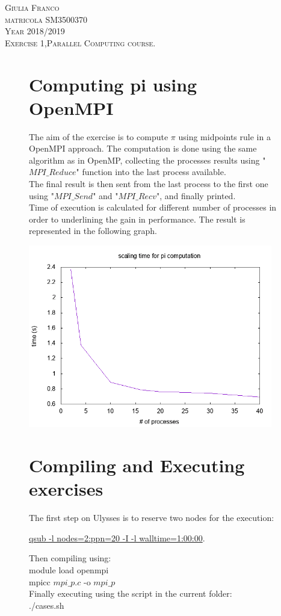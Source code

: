 \documentclass[12pt,a4paper,titlepage,twoside]{book}
\begin{document}
	\begin{flushleft}
		\large
		\textsc{Giulia Franco} \\
		\textsc{matricola SM3500370}\\
		\textsc{Year 2018/2019}
		\\
		\textsc{Exercise 1,Parallel Computing course.}
	\end{flushleft}
\newpage
\begin{figure}
	\section*{Computing pi using OpenMPI}
	The aim of the exercise is to compute $\pi$ using midpoints rule in a OpenMPI approach. The computation is done using the same algorithm as in OpenMP, collecting the processes results using "$MPI\_Reduce$" function into the last process available.\\
	The final result is then sent from the last process to the first one using "$MPI\_Send$" and "$MPI\_Recv$", and finally printed.\\
	Time of execution is calculated for different number of processes in order to  underlining the gain in performance. The result is represented in the following graph.
	\begin{center}
		\includegraphics[height=80mm, ]{mpi_p_timing}
	\end{center}
	\section*{Compiling and Executing exercises} 

The first step on Ulysses is to reserve two nodes for the execution:

\underline{qsub -l nodes=2:ppn=20 -I -l walltime=1:00:00}.\vspace{0.5cm}

Then compiling using:\\
module load openmpi\\
mpicc $mpi\_p.c$ -o $mpi\_p$\vspace{0.5cm}
\\Finally executing using the script in the current folder:\\
./cases.sh\vspace{0.5cm}
\end{figure}
\end{document}
